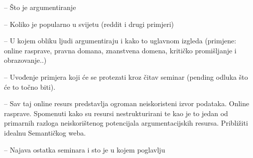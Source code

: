 -- Što je argumentiranje

-- Koliko je popularno u svijetu (reddit i drugi primjeri)

-- U kojem obliku ljudi argumentiraju i kako to uglavnom izgleda (primjene: 
online rasprave, pravna domana, znanstvena domena, kritičko promišljanje i
obrazovanje..)

-- Uvođenje primjera koji će se protezati kroz čitav seminar (pending odluka
što će to točno biti). 

-- Sav taj online resurs predstavlja ogroman neiskoristeni izvor podataka.
Online rasprave. Spomenuti kako su resursi nestrukturirani te kao je to jedan
od primarnih razloga neiskorištenog potencijala argumentacijskih resursa. 
Približiti idealnu Semantičkog weba. 

-- Najava ostatka seminara i sto je u kojem poglavlju

% 
% 

